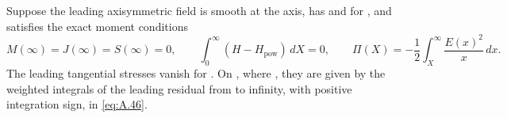 \begin{lemma}\label{lem:A.8}
Suppose the leading axisymmetric field is smooth at the axis, has  and
 for
, and satisfies the exact moment conditions
\[
  M(\infty)=J(\infty)=S(\infty)=0,\qquad
  \int_0^\infty(H-H_{\mathrm{pow}})\,dX=0,\qquad
  \Pi(X)=-\frac12\int_X^\infty\frac{E(x)^2}{x}\,dx.
\]
The leading tangential stresses vanish for . On
, where , they are given by the weighted integrals of the leading
residual from  to infinity, with positive integration sign, in \eqref{eq:A.46}.
\end{lemma}

